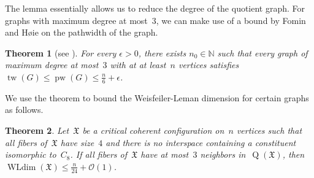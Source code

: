 \documentclass[english,a4paper]{article}
\theoremstyle{plain}
\newtheorem{theorem}             {Theorem}[section]
\theoremstyle{definition}
\newcommand{\Nat}{\ensuremath{\mathbb{N}}}
\newcommand{\coherentConfig}{\ensuremath{\mathfrak{X}}}
\DeclareMathOperator*{\WLdim}{WLdim}
\newcommand{\wldim}[1]{\ensuremath{\WLdim\left(#1\right)}}
\DeclareMathOperator*{\Quotient}{Q}
\newcommand{\quotientGraph}[1]{\ensuremath{\Quotient(#1)}}
\DeclareMathOperator{\treewidth}{tw}
\DeclareMathOperator{\pathwidth}{pw}
\newcommand{\cycle}[1]{\ensuremath{C_{#1}}}
\begin{document}
The lemma essentially allows us to reduce the degree of the quotient graph. For graphs with maximum degree at most~$3$, we can make use of a bound by Fomin and H{\o}ie on the pathwidth of the graph.


\begin{theorem}[see \cite{pathwidthCubicGraphs}]
\label{tw-cubic-graph/lem}
    For every $\epsilon > 0$, there exists $n_0 \in \Nat$ such that every graph of maximum degree at most~$3$ with at at least~$n$ vertices satisfies $\treewidth(G)\leq \pathwidth(G) \leq \frac{n}{6} + \epsilon$.
\end{theorem}


We use the theorem to bound the Weisfeiler-Leman dimension for certain graphs as follows.


\begin{theorem}
\label{4-cc:cfi-wldim/thm}
    Let~$\coherentConfig$ be a critical coherent configuration on~$n$ vertices such that all fibers of~$\coherentConfig$ have size~$4$ and there is no interspace containing a constituent isomorphic to~$\cycle{8}$.
    If all fibers of~$\coherentConfig$ have at most~$3$ neighbors in~$\quotientGraph{\coherentConfig}$, then~$\wldim{\coherentConfig} \leq \frac{n}{24} + \mathcal{O}(1)$.
\end{theorem}
\end{document}
